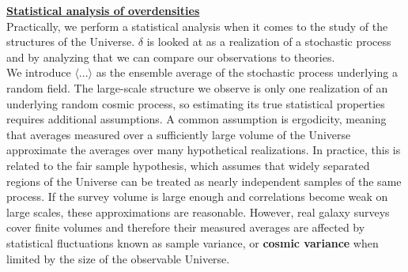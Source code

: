 \noindent \textbf{\underline{Statistical analysis of overdensities}} \\

Practically, we perform a statistical analysis when it comes to the study of the structures of the Universe. $\delta$ is looked at as a realization of a stochastic process 
and by analyzing that we can compare our observations to theories. \\

We introduce $\langle...\rangle$ as the ensemble average of the stochastic process underlying a random field. The large-scale structure we observe is only one realization 
of an underlying random cosmic process, so estimating its true statistical properties requires additional assumptions. A common assumption is ergodicity, meaning that 
averages measured over a sufficiently large volume of the Universe approximate the averages over many hypothetical realizations. In practice, this is related to the fair 
sample hypothesis, which assumes that widely separated regions of the Universe can be treated as nearly independent samples of the same process. If the survey volume is 
large enough and correlations become weak on large scales, these approximations are reasonable. However, real galaxy surveys cover finite volumes and therefore their measured 
averages are affected by statistical fluctuations known as sample variance, or \textbf{cosmic variance} when limited by the size of the observable Universe.\\

